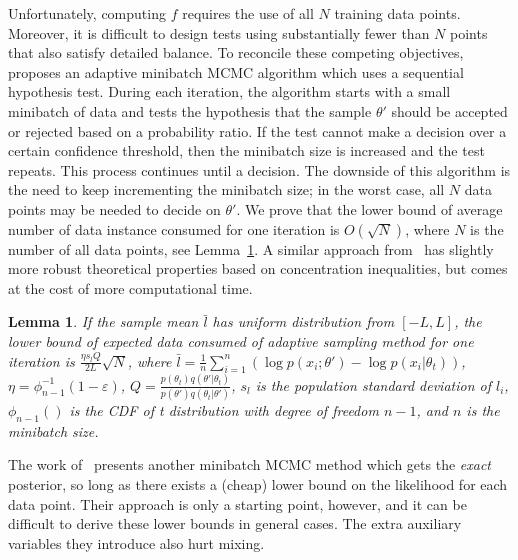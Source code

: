 \documentclass{article}
\newtheorem{lemma}{Lemma}
\begin{document}
Unfortunately, computing $f$ requires the use of all $N$ training data points. Moreover, it is
difficult to design tests using substantially fewer than $N$ points that also satisfy detailed
balance. To reconcile these competing objectives,~\cite{cutting_mh_2014} proposes an adaptive
minibatch MCMC algorithm which uses a sequential hypothesis test. During each iteration, the
algorithm starts with a small minibatch of data and tests the hypothesis that the sample $\theta'$
should be accepted or rejected based on a probability ratio. If the test cannot make a decision
over a certain confidence threshold, then the minibatch size is increased and the test repeats. This
process continues until a decision. The downside of this algorithm is the need to keep incrementing
the minibatch size; in the worst case, all $N$ data points may be needed to decide on $\theta'$. We prove that the lower bound of average number of data instance consumed for one iteration is $O(\sqrt{N})$, where $N$ is the number of all data points, see Lemma~\ref{lem:efficienty_cutting}. A
similar approach from~\cite{icml2014c1_bardenet14} has slightly more robust theoretical properties
based on concentration inequalities, but comes at the cost of more computational time.

\begin{lemma}\label{lem:efficienty_cutting}
If the sample mean $\bar{l}$ has uniform distribution from $[-L,L]$, the lower bound of expected data consumed of adaptive sampling method for one iteration is $\frac{\eta s_{l}Q}{2L}\sqrt{N}$, where $\bar{l} = \frac{1}{n}\sum_{i=1}^{n} \left (\log p(x_i; \theta') - \log p(x_i| \theta_t)\right )$, $\eta = \phi^{-1}_{n-1}(1-\varepsilon)$, $Q=\frac{p(\theta_t)q(\theta'|\theta_t)}{p(\theta')q(\theta_t|\theta')}$, $s_l$ is the population standard deviation of $l_i$, $\phi_{n-1}()$ is the CDF of t distribution with degree of freedom $n-1$, and $n$ is the minibatch size.
\end{lemma}

The work of~\cite{conf/uai/MaclaurinA14} presents another minibatch MCMC method which gets the
\emph{exact} posterior, so long as there exists a (cheap) lower bound on the likelihood for each
data point. Their approach is only a starting point, however, and it can be difficult to derive
these lower bounds in general cases. The extra auxiliary variables they introduce also hurt mixing.
\end{document}
